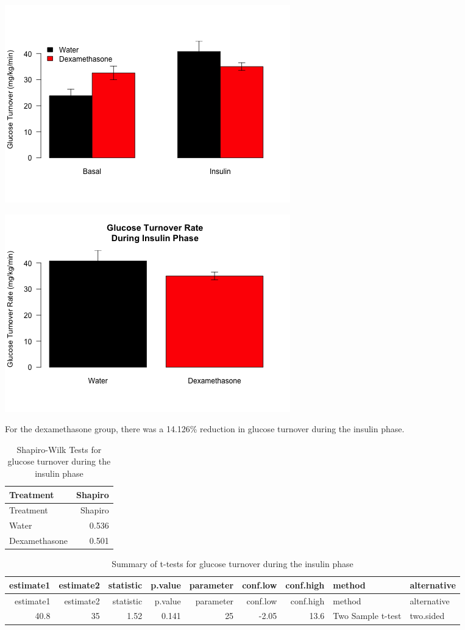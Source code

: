 \documentclass[]{article}
\begin{document}
\includegraphics{figures/gtr-barplot-hfd-1.png}

\includegraphics{figures/gtr-barplot-hfd-insulin-1.png}

For the dexamethasone group, there was a 14.126\% reduction in glucose
turnover during the insulin phase.

\begin{longtable}[]{@{}lr@{}}
\caption{Shapiro-Wilk Tests for glucose turnover during the insulin
phase}\tabularnewline
\toprule
Treatment & Shapiro\tabularnewline
\midrule
\endfirsthead
\toprule
Treatment & Shapiro\tabularnewline
\midrule
\endhead
Water & 0.536\tabularnewline
Dexamethasone & 0.501\tabularnewline
\bottomrule
\end{longtable}

\begin{longtable}[]{@{}rrrrrrrll@{}}
\caption{Summary of t-tests for glucose turnover during the insulin
phase}\tabularnewline
\toprule
estimate1 & estimate2 & statistic & p.value & parameter & conf.low &
conf.high & method & alternative\tabularnewline
\midrule
\endfirsthead
\toprule
estimate1 & estimate2 & statistic & p.value & parameter & conf.low &
conf.high & method & alternative\tabularnewline
\midrule
\endhead
40.8 & 35 & 1.52 & 0.141 & 25 & -2.05 & 13.6 & Two Sample t-test &
two.sided\tabularnewline
\bottomrule
\end{longtable}
\end{document}
